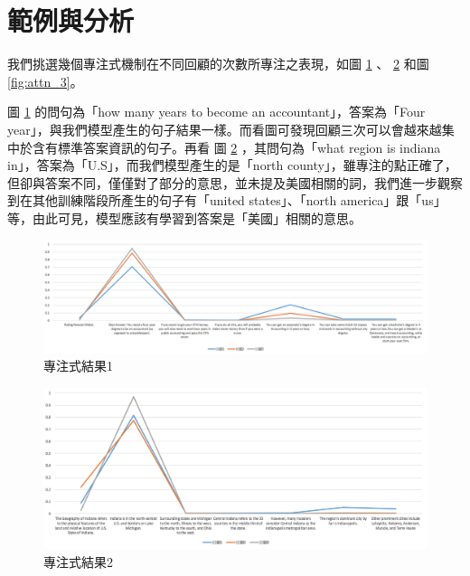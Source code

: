 \section{範例與分析}
我們挑選幾個專注式機制在不同回顧的次數所專注之表現，如圖 \ref{fig:attn_1} 、 \ref{fig:attn_2} 和圖\ref{fig:attn_3}。

圖 \ref{fig:attn_1} 的問句為「how many years to become an accountant」，答案為「Four year」，與我們模型產生的句子結果一樣。而看圖可發現回顧三次可以會越來越集中於含有標準答案資訊的句子。再看
圖 \ref{fig:attn_2} ，其問句為「what region is indiana in」，答案為「U.S」，而我們模型產生的是「north county」，雖專注的點正確了，但卻與答案不同，僅僅對了部分的意思，並未提及美國相關的詞，我們進一步觀察到在其他訓練階段所產生的句子有「united states」、「north america」跟「us」等，由此可見，模型應該有學習到答案是「美國」相關的意思。
\begin{figure}
    \centering
    \includegraphics[scale=0.55,angle=90]{images/chap3_attn1.png}
    \caption{專注式結果1}\label{fig:attn_1}
\end{figure}
\begin{figure}
    \centering
    \includegraphics[scale=0.58,angle=90]{images/chap3_attn2.png}
    \caption{專注式結果2}\label{fig:attn_2}
\end{figure}

